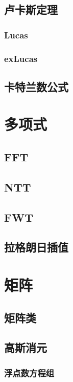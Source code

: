 \documentclass[a4paper,twocolumn]{article}
\begin{document}
\subsection{卢卡斯定理}
\subsubsection{Lucas}

\subsubsection{exLucas}

\subsection{卡特兰数公式}

\section{多项式}
\subsection{FFT}

\subsection{NTT}

\subsection{FWT}

\subsection{拉格朗日插值}

\section{矩阵}
\subsection{矩阵类}

\subsection{高斯消元}
\subsubsection{浮点数方程组}

\end{document}
